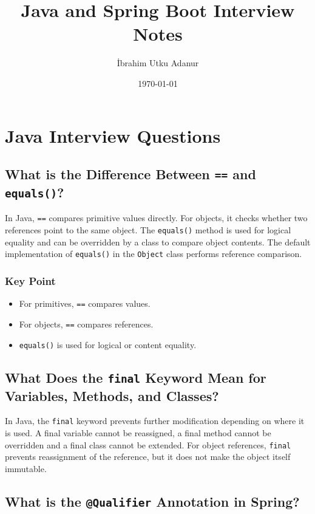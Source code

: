 \documentclass[12pt,a4paper]{article}
\title{Java and Spring Boot Interview Notes}
\author{İbrahim Utku Adanur}
\date{\today}
\begin{document}
\maketitle
\tableofcontents
\clearpage

\section{Java Interview Questions}

\subsection{What is the Difference Between \texttt{==} and \texttt{equals()}?}

In Java, \texttt{==} compares primitive values directly. For objects, it
checks whether two references point to the same object. The
\texttt{equals()} method is used for logical equality and can be overridden
by a class to compare object contents. The default implementation of
\texttt{equals()} in the \texttt{Object} class performs reference
comparison.

\subsubsection*{Key Point}

\begin{itemize}
    \item For primitives, \texttt{==} compares values.
    \item For objects, \texttt{==} compares references.
    \item \texttt{equals()} is used for logical or content equality.
\end{itemize}

\subsection{What Does the \texttt{final} Keyword Mean for Variables, Methods, and Classes?}

In Java, the \texttt{final} keyword prevents further modification depending
on where it is used. A final variable cannot be reassigned, a final method
cannot be overridden and a final class cannot be extended. For object
references, \texttt{final} prevents reassignment of the reference, but it
does not make the object itself immutable.

\subsection{What is the \texttt{@Qualifier} Annotation in Spring?}
\end{document}
